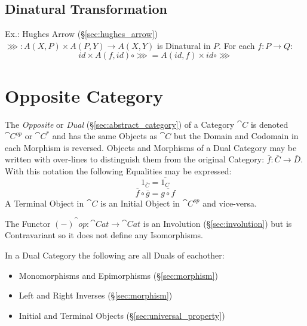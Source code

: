 \subsection{Dinatural Transformation}
\label{sec:dinatural_transformation}

Ex.: Hughes Arrow (\S\ref{sec:hughes_arrow}) $\ggg : A (X,P) \times A
(P,Y) \rightarrow A (X,Y)$ is Dinatural in $P$. For each $f : P
\rightarrow Q$:
\[
  id \times A(f,id) \circ \ggg = A(id,f) \times id \circ \ggg
\]



\section{Opposite Category}\label{sec:opposite_category}

The \emph{Opposite} or \emph{Dual} (\S\ref{sec:abstract_category})
of a Category $\cat{C}$ is denoted $\cat{C^{op}}$ or
$\cat{C^*}$ and has the same Objects as $\cat{C}$ but the Domain
and Codomain in each Morphism is reversed. Objects and Morphisms of a
Dual Category may be written with over-lines to distinguish them from
the original Category: $\overline{f}: \overline{C} \rightarrow
\overline{D}$. With this notation the following Equalities may be
expressed:
\[
  1_{\overline{C}} = \overline{1_C}
\]\[
  \overline{f} \circ \overline{g} = \overline{g \circ f}
\]
A Terminal Object in $\cat{C}$ is an Initial Object in
$\cat{C^{op}}$ and vice-versa.

The Functor $(-)^\cat{op} : \cat{Cat} \rightarrow \cat{Cat}$
is an Involution (\S\ref{sec:involution}) but is Contravariant so it
does not define any Isomorphisms.

In a Dual Category the following are all Duals of eachother:
\begin{itemize}
  \item Monomorphisms and Epimorphisms (\S\ref{sec:morphism})
  \item Left and Right Inverses (\S\ref{sec:morphism})
  \item Initial and Terminal Objects (\S\ref{sec:universal_property})
\end{itemize}



